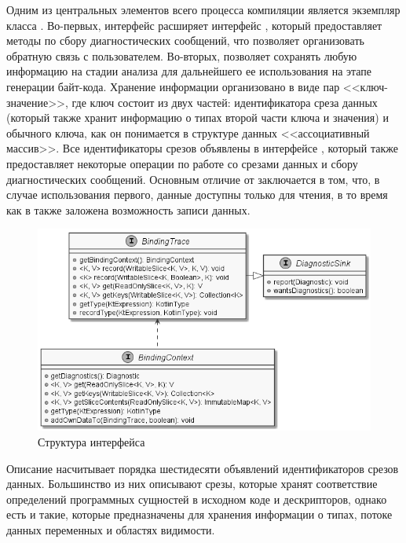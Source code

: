 Одним из центральных элементов всего процесса компиляции является экземпляр класса . Во-первых, интерфейс  расширяет интерфейс , который предоставляет методы по сбору диагностических сообщений, что позволяет организовать обратную связь с пользователем. Во-вторых,  позволяет сохранять любую информацию на стадии анализа для дальнейшего ее использования на этапе генерации байт-кода. Хранение информации организовано в виде пар <<ключ-значение>>, где ключ состоит из двух частей: идентификатора среза данных (который также хранит информацию о типах второй части ключа и значения) и обычного ключа, как он понимается в структуре данных <<ассоциативный массив>>.
Все идентификаторы срезов объявлены в интерфейсе , который также предоставляет некоторые операции по работе со срезами данных и сбору диагностических сообщений. Основным отличие  от  заключается в том, что, в случае использования первого, данные доступны только для чтения, в то время как в  также заложена возможность записи данных. 

\begin{figure}[htbp]
    \centering
    \includegraphics[width=\textwidth]{resources/06/04_binding_context.png}
    \caption{Структура интерфейса }
    \label{fig05:binding-trace-scheme}
\end{figure}

Описание  насчитывает порядка шестидесяти объявлений идентификаторов срезов данных. Большинство из них описывают срезы, которые хранят соответствие определений программных сущностей в исходном коде и дескрипторов, однако есть и такие, которые предназначены для хранения информации о типах, потоке данных переменных и областях видимости. %


